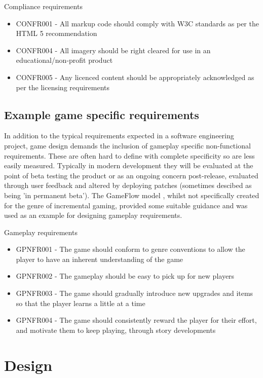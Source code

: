 \documentclass[twoside]{bhamthesis}
\begin{document}
\noindent
Compliance requirements
\begin{itemize}
\item[] CONFR001 - All markup code should comply with W3C standards as per the HTML 5 recommendation
\item[] CONFR004 - All imagery should be right cleared for use in an educational/non-profit product
\item[] CONFR005 - Any licenced content should be appropriately acknowledged as per the licensing requirements
\end{itemize}

\subsection{Example game specific requirements}
In addition to the typical requirements expected in a software engineering project, game design demands the inclusion of gameplay specific non-functional requirements. These are often hard to define with complete specificity so are less easily measured. Typically in modern development they will be evaluated at the point of beta testing the product or as an ongoing concern post-release, evaluated through user feedback and altered by deploying patches (sometimes descibed as being 'in permanent beta'). The GameFlow model \cite{sweetser_gameflow_2017}, whilst not specifically created for the genre of incremental gaming, provided some suitable guidance and was used as an example for designing gameplay requirements.


\bigskip
\noindent
Gameplay requirements
\begin{itemize}
\item[] GPNFR001 - The game should conform to genre conventions to allow the player to have an inherent understanding of the game
\item[] GPNFR002 - The gameplay should be easy to pick up for new players
\item[] GPNFR003 - The game should gradually introduce new upgrades and items so that the player learns a little at a time
\item[] GPNFR004 - The game should consistently reward the player for their effort, and motivate them to keep playing, through story developments
\end{itemize}



\section{Design}
\end{document}
